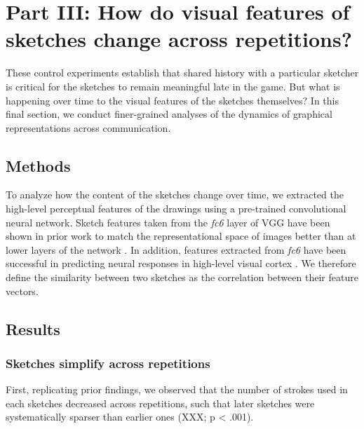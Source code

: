 \documentclass[10pt,letterpaper]{article}
\begin{document}
\section{Part III: How do visual features of sketches change across repetitions?}

These control experiments establish that shared history with a particular sketcher is critical for the sketches to remain meaningful late in the game. 
But what is happening over time to the visual features of the sketches themselves? 
In this final section, we conduct finer-grained analyses of the dynamics of graphical representations across communication.

\subsection{Methods}

To analyze how the content of the sketches change over time, we extracted the high-level perceptual features of the drawings using a pre-trained convolutional neural network. 
Sketch features taken from the \textit{fc6} layer of VGG have been shown in prior work to match the representational space of images better than at lower layers of the network \cite{FanCommon2018}. 
In addition, features extracted from \emph{fc6} have been successful in predicting neural responses in high-level visual cortex \cite{yamins2014performance}.
We therefore define the similarity between two sketches as the correlation between their feature vectors.

\subsection{Results}

\subsubsection{Sketches simplify across repetitions}

First, replicating prior findings, we observed that the number of strokes used in each sketches decreased across repetitions, such that later sketches were systematically sparser than earlier ones (XXX; p < .001).
\end{document}
